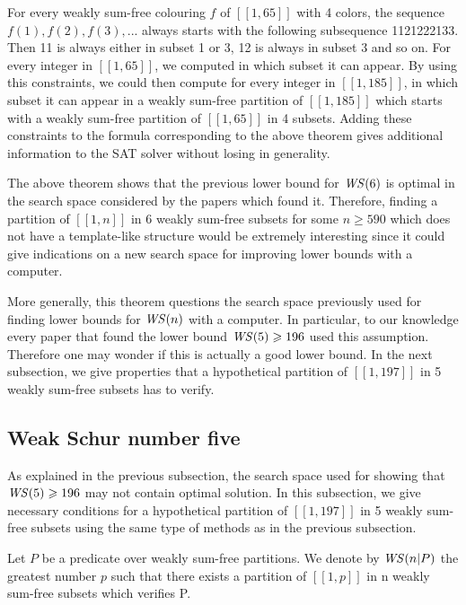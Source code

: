 \par
For every weakly sum-free colouring \(f\) of \([\![1,65]\!]\) with 4 colors, the sequence \(f(1), f(2), f(3), ...\) always
starts with the following subsequence 1121222133. Then 11 is always
either in subset 1 or 3, 12 is always in subset 3 and so on. For every integer in \([\![1,65]\!]\), we computed in which
subset it can appear.
By using this constraints, we could then compute for every integer in \([\![1,185]\!]\), in which subset it can appear
in a weakly sum-free
partition of \([\![1,185]\!]\) which starts with a weakly sum-free partition of \([\![1,65]\!]\) in 4 subsets. Adding
these constraints to the
formula corresponding to the above theorem gives additional information to the SAT solver without losing in generality.

\par
The above theorem shows that the previous lower bound for \(\mathit{WS} (6)\) is optimal in the search space considered by the
papers which found it.
Therefore, finding a partition of \([\![1,n]\!]\) in 6 weakly sum-free subsets for some \(n \geqslant 590\) which does
not have a template-like structure
would be extremely interesting since it could give indications on a new search space for improving lower bounds with a
computer. 

\par More generally, this theorem questions the search space previously used for finding lower bounds for \(\mathit{WS} (n)\) 
with a computer. In particular, to our knowledge every paper that found the lower bound \(\mathit{WS} (5) \geqslant 196\) 
used this assumption. Therefore one may wonder if this is actually a good lower bound. In the next subsection, we give 
properties that a hypothetical partition of \([\![1,197]\!]\) in 5 weakly sum-free subsets has to verify.


\subsection{Weak Schur number five}

\qquad As explained in the previous subsection, the search space used for showing that \(\mathit{WS} (5) \geqslant 196\) may not contain
optimal solution. In this subsection,
we give necessary conditions for a hypothetical partition of \([\![1,197]\!]\) in 5 weakly sum-free subsets using the
same type of methods as in the
previous subsection.

\begin{notation}
Let \(P\) be a predicate over weakly sum-free partitions. We denote by \(\mathit{WS} (n | P)\) the greatest number \(p\) such that
there exists a partition of
\([\![1,p]\!]\) in n weakly sum-free subsets which verifies P.
\end{notation}

